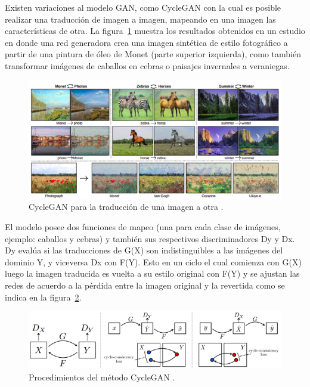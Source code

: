 Existen variaciones al modelo GAN, como CycleGAN \parencite{r48} con la cual es posible realizar una traducción de imagen a imagen, mapeando en una imagen las características de otra. La figura~\ref{fig:gan3} muestra los resultados obtenidos en un estudio \parencite{r48} en donde una red generadora crea una imagen sintética de estilo fotográfico a partir de una pintura de óleo de Monet (parte superior izquierda), como también transformar imágenes de caballos en cebras o paisajes invernales a veraniegas. 


\begin{figure}[th]
\centering
\includegraphics [scale = 0.85]{Figures/figura_11.PNG}
\decoRule
\caption[CycleGAN] {CycleGAN para la traducción de una imagen a otra \parencite{r48}.}
\label{fig:gan3}
\end{figure}

El modelo posee dos funciones de mapeo (una para cada clase de imágenes, ejemplo: caballos y cebras) y también sus respectivos discriminadores Dy y Dx. Dy evalúa si las traducciones de G(X) son indistinguibles a las imágenes del dominio Y, y viceversa Dx con F(Y). Esto en un ciclo el cual comienza con G(X) luego la imagen traducida es vuelta a su estilo original con F(Y) y se ajustan las redes de acuerdo a la pérdida entre la imagen original y la revertida como se indica en la figura~\ref{fig:gan4}.

\begin{figure}[th]
\centering
\includegraphics [scale = 0.85]{Figures/figura_12.PNG}
\decoRule
\caption[CycleGAN] {Procedimientos del método CycleGAN \parencite{r48}.}
\label{fig:gan4}
\end{figure}

